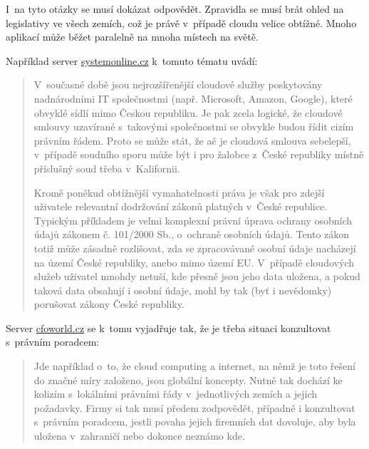 I~na tyto otázky se musí dokázat odpovědět. Zpravidla se musí brát ohled na legislativy ve všech zemích, což je právě v~případě cloudu velice obtížné. Mnoho aplikací může běžet paralelně na mnoha místech na světě.

Například server \href{http://www.systemonline.cz/clanky/pravni-aspekty-cloud-computingu.htm}{systemonline.cz} k~tomuto tématu uvádí:
\begin{quotation}
V~současné době jsou nejrozšířenější cloudové služby poskytovány nadnárodními IT společnostmi (např. Microsoft, Amazon, Google), které obvyklé sídlí mimo Českou republiku. Je pak zcela logické, že cloudové smlouvy uzavírané s~takovými společnostmi se obvykle budou řídit cizím právním řádem. Proto se může stát, že ač je cloudová smlouva sebelepší, v~případě soudního sporu může být i pro žalobce z~České republiky místně příslušný soud třeba v~Kalifornii. 

Kromě poněkud obtížnější vymahatelnosti práva je však pro zdejší uživatele relevantní dodržování zákonů platných v~České republice. Typickým příkladem je velmi komplexní právní úprava ochrany osobních údajů zákonem č. 101/2000 Sb., o~ochraně osobních údajů. Tento zákon totiž může zásadně rozlišovat, zda se zpracovávané osobní údaje nacházejí na území České republiky, anebo mimo území EU. V~případě cloudových služeb uživatel mnohdy netuší, kde přesně jsou jeho data uložena, a pokud taková data obsahují i osobní údaje, mohl by tak (byť i nevědomky) porušovat zákony České republiky.\cite{systemonline:pravniAspekty}
\end{quotation}

Server \href{http://cfoworld.cz/analyzy/cloud-computing-zajimave-moznosti-ale-i-velka-pravni-rizika-306}{cfoworld.cz} se k~tomu vyjadřuje tak, že je třeba situaci konzultovat s~právním poradcem:
\begin{quote}
Jde například o~to, že cloud computing a internet, na němž je toto řešení do značné míry založeno, jsou globální koncepty. Nutně tak dochází ke kolizím s~lokálními právními řády v~jednotlivých zemích a jejich požadavky. Firmy si tak musí předem zodpovědět, případně i konzultovat s~právním poradcem, jestli povaha jejich firemních dat dovoluje, aby byla uložena v~zahraničí nebo dokonce neznámo kde.\cite{cfoworld:pravniRizika}
\end{quote}

